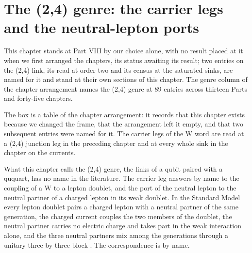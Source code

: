 \section{The (2,4) genre: the carrier legs and the neutral-lepton ports}\label{mod:VI-2a-2-4-genre-the-carrier-legs-and-the-neutral-lepton-ports}
\begin{chtable}
This chapter stands at Part VIII by our choice alone, with no result placed at it when we first arranged the chapters, its status awaiting its result; two entries on the (2,4) link, its read at order two and its census at the saturated sinks, are named for it and stand at their own sections of this chapter. The genre column of the chapter arrangement names the (2,4) genre at 89 entries across thirteen Parts and forty-five chapters.
\end{chtable}
\chdeps{}{}
The box is a table of the chapter arrangement: it records that this chapter exists because we changed the frame, that the arrangement left it empty, and that two subsequent entries were named for it. The carrier legs of the W word are read at a (2,4) junction leg in the preceding chapter and at every whole sink in the chapter on the currents.
\begin{chbridge}
What this chapter calls the (2,4) genre, the links of a qubit paired with a ququart, has no name in the literature. The carrier leg answers by name to the coupling of a W to a lepton doublet, and the port of the neutral lepton to the neutral partner of a charged lepton in its weak doublet. In the Standard Model every lepton doublet pairs a charged lepton with a neutral partner of the same generation, the charged current couples the two members of the doublet, the neutral partner carries no electric charge and takes part in the weak interaction alone, and the three neutral partners mix among the generations through a unitary three-by-three block \cite{Pontecorvo1958,Maki1962,Weinberg1967}. The correspondence is by name.
\end{chbridge}
